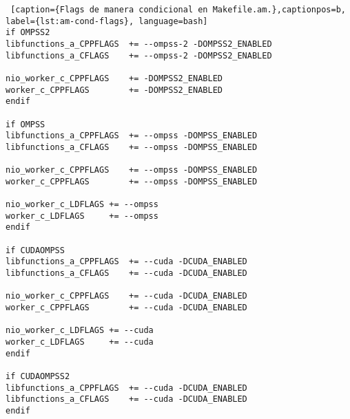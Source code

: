\begin{lstlisting} [caption={Flags de manera condicional en Makefile.am.},captionpos=b, label={lst:am-cond-flags}, language=bash]
if OMPSS2
libfunctions_a_CPPFLAGS  += --ompss-2 -DOMPSS2_ENABLED
libfunctions_a_CFLAGS    += --ompss-2 -DOMPSS2_ENABLED

nio_worker_c_CPPFLAGS    += -DOMPSS2_ENABLED
worker_c_CPPFLAGS        += -DOMPSS2_ENABLED
endif

if OMPSS
libfunctions_a_CPPFLAGS  += --ompss -DOMPSS_ENABLED
libfunctions_a_CFLAGS    += --ompss -DOMPSS_ENABLED

nio_worker_c_CPPFLAGS    += --ompss -DOMPSS_ENABLED
worker_c_CPPFLAGS        += --ompss -DOMPSS_ENABLED

nio_worker_c_LDFLAGS += --ompss
worker_c_LDFLAGS     += --ompss
endif

if CUDAOMPSS
libfunctions_a_CPPFLAGS  += --cuda -DCUDA_ENABLED
libfunctions_a_CFLAGS    += --cuda -DCUDA_ENABLED

nio_worker_c_CPPFLAGS    += --cuda -DCUDA_ENABLED
worker_c_CPPFLAGS        += --cuda -DCUDA_ENABLED

nio_worker_c_LDFLAGS += --cuda
worker_c_LDFLAGS     += --cuda
endif

if CUDAOMPSS2
libfunctions_a_CPPFLAGS  += --cuda -DCUDA_ENABLED
libfunctions_a_CFLAGS    += --cuda -DCUDA_ENABLED
endif
\end{lstlisting}


